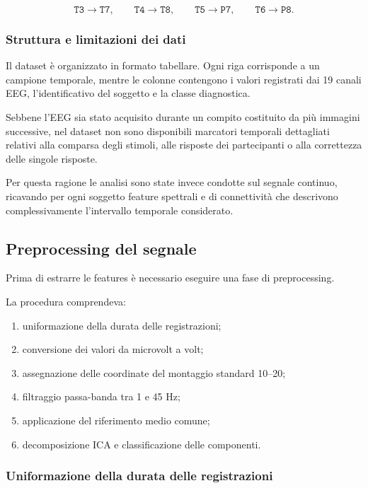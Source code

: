 \begin{equation}
	\texttt{T3}\rightarrow\texttt{T7},
	\qquad
	\texttt{T4}\rightarrow\texttt{T8},
	\qquad
	\texttt{T5}\rightarrow\texttt{P7},
	\qquad
	\texttt{T6}\rightarrow\texttt{P8}.
\end{equation}


\subsubsection{Struttura e limitazioni dei dati}

Il dataset è organizzato in formato tabellare. Ogni riga corrisponde
a un campione temporale, mentre le colonne contengono i valori
registrati dai 19 canali EEG, l'identificativo del soggetto e la
classe diagnostica.

Sebbene l'EEG sia stato acquisito durante un compito costituito da
più immagini successive, nel dataset non sono disponibili marcatori
temporali dettagliati relativi alla comparsa degli stimoli, alle
risposte dei partecipanti o alla correttezza delle singole risposte.

Per questa ragione le analisi sono state invece condotte sul segnale continuo, ricavando per ogni soggetto feature spettrali e di connettività che
descrivono complessivamente l'intervallo temporale considerato.

\subsection{Preprocessing del segnale}

Prima di estrarre le features è necessario eseguire una fase di preprocessing.  

La procedura comprendeva:

\begin{enumerate}
	\item uniformazione della durata delle registrazioni;
	\item conversione dei valori da microvolt a volt;
	\item assegnazione delle coordinate del montaggio standard 10--20;
	\item filtraggio passa-banda tra 1 e 45 Hz;
	\item applicazione del riferimento medio comune;
	\item decomposizione ICA e classificazione delle componenti.
\end{enumerate}


\subsubsection{Uniformazione della durata delle registrazioni}

